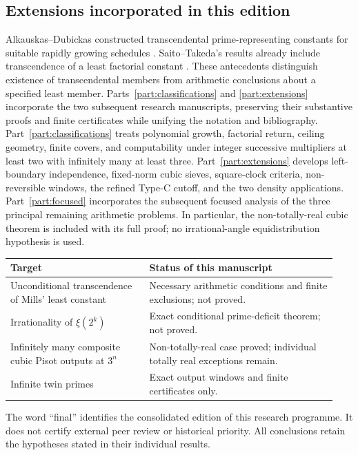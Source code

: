 \documentclass[11pt,a4paper]{article}
\theoremstyle{definition}
\theoremstyle{remark}
\numberwithin{equation}{section}
\begin{document}
\subsection{Extensions incorporated in this edition}
Alkauskas--Dubickas constructed transcendental prime-representing
constants for suitable rapidly growing schedules
\cite{AlkauskasDubickas2004}. Saito--Takeda's results already include
transcendence of a least factorial constant \cite{SaitoTakeda2022}.
These antecedents distinguish existence of transcendental members from
arithmetic conclusions about a specified least member.
Parts~\ref{part:classifications} and \ref{part:extensions} incorporate the
two subsequent research manuscripts, preserving their substantive proofs
and finite certificates while unifying the notation and bibliography.
Part~\ref{part:classifications} treats polynomial growth, factorial
return, ceiling geometry, finite covers, and computability under integer
successive multipliers at least two with infinitely many at least three.
Part~\ref{part:extensions} develops left-boundary independence,
fixed-norm cubic sieves, square-clock criteria, non-reversible windows,
the refined Type-C cutoff, and the two density applications.
Part~\ref{part:focused} incorporates the subsequent focused analysis of
the three principal remaining arithmetic problems. In particular,
the non-totally-real cubic theorem is included with its full proof;
no irrational-angle equidistribution hypothesis is used.

\begin{center}
\begin{tabular}{@{}p{0.40\linewidth}p{0.54\linewidth}@{}}
\toprule
Target & Status of this manuscript\\ \midrule
Unconditional transcendence of Mills' least constant
& Necessary arithmetic conditions and finite exclusions; not proved.\\[3pt]
Irrationality of $\xi(2^k)$
& Exact conditional prime-deficit theorem; not proved.\\[3pt]
Infinitely many composite cubic Pisot outputs at $3^n$
& Non-totally-real case proved; individual totally real exceptions remain.\\[3pt]
Infinite twin primes
& Exact output windows and finite certificates only.\\
\bottomrule
\end{tabular}
\end{center}
The word ``final'' identifies the consolidated edition of this research
programme. It does not certify external peer review or historical priority.
All conclusions retain the hypotheses stated in their individual results.
\end{document}
